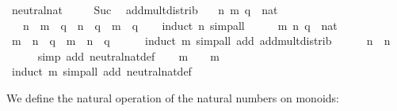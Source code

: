 \begin{isabellebody}
\isanewline
{}\isamarkupfalse%
\ neutral{\isacharunderscore}nat\ \isanewline
\ \ {\isachardoublequoteopen}{\isasymone}\ {\isacharequal}\ Suc\ {}{\isachardoublequoteclose}\isanewline
\isanewline
{}\isamarkupfalse%
\ add{\isacharunderscore}mult{\isacharunderscore}distrib{\isacharcolon}\isanewline
\ \ \ n\ m\ q\ {\isacharcolon}{\isacharcolon}\ nat\isanewline
\ \ \ {\isachardoublequoteopen}{\isacharparenleft}n\ {\isacharplus}\ m{\isacharparenright}\ {\isasymotimes}\ q\ {\isacharequal}\ n\ {\isasymotimes}\ q\ {\isacharplus}\ m\ {\isasymotimes}\ q{\isachardoublequoteclose}\isanewline
\ \ \isamarkupfalse%
\ {\isacharparenleft}induct\ n{\isacharparenright}\ simp{\isacharunderscore}all\isanewline
\isanewline
{}\isamarkupfalse%
\ \isamarkupfalse%
\isanewline
\ \ \isamarkupfalse%
\ m\ n\ q\ {\isacharcolon}{\isacharcolon}\ nat\isanewline
\ \ \isamarkupfalse%
\ {\isachardoublequoteopen}m\ {\isasymotimes}\ n\ {\isasymotimes}\ q\ {\isacharequal}\ m\ {\isasymotimes}\ {\isacharparenleft}n\ {\isasymotimes}\ q{\isacharparenright}{\isachardoublequoteclose}\isanewline
\ \ \ \ \isamarkupfalse%
\ {\isacharparenleft}induct\ m{\isacharparenright}\ {\isacharparenleft}simp{\isacharunderscore}all\ add{\isacharcolon}\ add{\isacharunderscore}mult{\isacharunderscore}distrib{\isacharparenright}\isanewline
\ \ \isamarkupfalse%
\ {\isachardoublequoteopen}{\isasymone}\ {\isasymotimes}\ n\ {\isacharequal}\ n{\isachardoublequoteclose}\isanewline
\ \ \ \ \isamarkupfalse%
\ {\isacharparenleft}simp\ add{\isacharcolon}\ neutral{\isacharunderscore}nat{\isacharunderscore}def{\isacharparenright}\isanewline
\ \ \isamarkupfalse%
\ {\isachardoublequoteopen}m\ {\isasymotimes}\ {\isasymone}\ {\isacharequal}\ m{\isachardoublequoteclose}\isanewline
\ \ \ \ \isamarkupfalse%
\ {\isacharparenleft}induct\ m{\isacharparenright}\ {\isacharparenleft}simp{\isacharunderscore}all\ add{\isacharcolon}\ neutral{\isacharunderscore}nat{\isacharunderscore}def{\isacharparenright}\isanewline
{}\isamarkupfalse%
\isanewline
\isanewline
{}\isamarkupfalse%
%
\endisatagquoteme
{\isafoldquoteme}%
%
\isadelimquoteme
%
\endisadelimquoteme
%
\begin{isamarkuptext}%
\noindent We define the natural operation of the natural numbers
  on monoids:%
\end{isamarkuptext}%

\end{isabellebody}
